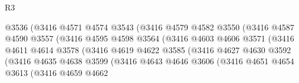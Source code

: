 \begin{lexlean}{R3}
\begin{coremodule}
                                    @3536
                                    (@3416
                                      @4571
                                      @4574
                                      @3543
                                      (@3416
                                        @4579
                                        @4582
                                        @3550
                                        (@3416
                                          @4587
                                          @4590
                                          @3557
                                          (@3416
                                            @4595
                                            @4598
                                            @3564
                                            (@3416
                                              @4603
                                              @4606
                                              @3571
                                              (@3416
                                                @4611
                                                @4614
                                                @3578
                                                (@3416
                                                  @4619
                                                  @4622
                                                  @3585
                                                  (@3416
                                                    @4627
                                                    @4630
                                                    @3592
                                                    (@3416
                                                      @4635
                                                      @4638
                                                      @3599
                                                      (@3416
                                                        @4643
                                                        @4646
                                                        @3606
                                                        (@3416
                                                          @4651
                                                          @4654
                                                          @3613
                                                          (@3416
                                                            @4659
                                                            @4662

\end{coremodule}
\end{lexlean}
